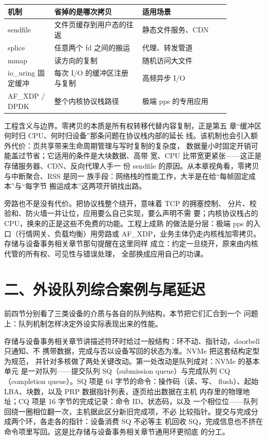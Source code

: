 \begin{longtable}{L{0.18\linewidth}L{0.34\linewidth}L{0.34\linewidth}}
\toprule
机制 & 省掉的是哪次拷贝 & 适用场景 \\
\midrule
sendfile & 文件页缓存到用户态的往返 & 静态文件服务、CDN \\\tablerowrule
splice & 任意两个 fd 之间的搬运 & 代理、转发管道 \\\tablerowrule
mmap & 读方向的复制 & 随机访问大文件 \\\tablerowrule
io\_uring 固定缓冲 & 每次 I/O 的缓冲区注册与复制 & 高频异步 I/O \\\tablerowrule
AF\_XDP / DPDK & 整个内核协议栈路径 & 极端 pps 的专用应用 \\
\bottomrule
\end{longtable}

工程含义与边界。零拷贝的本质是所有权转移代替内容复制，正是第五
章“缓冲区何时归 CPU、何时归设备”那条问题在协议栈内部的延长
线。该机制也会引入额外代价：页共享带来生命周期管理与写时复制的复杂度，
数据量小时固定开销可能盖过节省；它适用的条件是大块数据、高带
宽、CPU 比带宽更紧张——这正是存储服务器、CDN、反向代理人手一
份 sendfile 的原因。从本章视角看，零拷贝与中断聚合、RSS 是同一
族手段：网络栈的性能工作，大半是在给“每帧固定成本”与“每字节
搬运成本”这两项开销找出路。

旁路也不是没有代价。把协议栈整个绕开，意味着 TCP 的拥塞控制、
分片、校验和、防火墙一并让位，应用要么自己实现，要么声明不需
要；内核协议栈占的 CPU，换来的正是这些不免费的功能。工程上成熟
的做法是分层：极端 pps 的入口（行情网关、负载均衡）用旁路或
AF\_XDP，业务主体仍走内核栈加零拷贝。存储与设备事务相关章节那句提醒在这里同样
成立：约定一旦绕开，原来由内核代管的所有权、可见性与错误处理，
全部换成应用自己的功课。

\section{二、外设队列综合案例与尾延迟}

前四节分别看了三类设备的介质与各自的队列结构，本节把它们汇合到一个
问题上：队列机制怎样决定外设实际表现出来的性能。

存储与设备事务相关章节讲描述符环时给过一般结构：环不动、指针动，doorbell 只通知、不
携带数据，完成与否以设备写回的状态为准。NVMe 把这套结构定型为规范，
并针对多核做了两处关键改动。第一处改动是队列成对：NVMe 的基本单元
是一对队列——提交队列 SQ（submission queue）与完成队列 CQ
（completion queue）。SQ 项是 64 字节的命令：操作码（读、写、
flush）、起始 LBA、块数，以及 PRP 数据指针列表，逐页给出数据在主机
内存里的物理地址；CQ 项是 16 字节的完成记录：命令 ID、状态码，以及
一个相位位——队列回绕一圈相位翻一次，主机据此区分新旧完成项，不必
比较指针。提交与完成分成两个环，各走各的指针：设备消费 SQ 不必等主
机回收 SQ，完成信息也不挤在命令项里写回。这是比存储与设备事务相关章节通用环更彻底
的分工。

